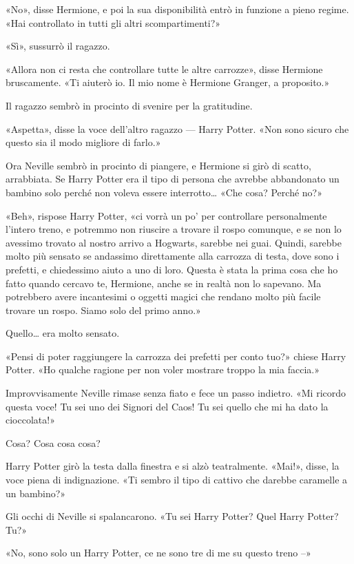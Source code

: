 «No», disse Hermione, e poi la sua disponibilità entrò in funzione a pieno regime. «Hai controllato in tutti gli altri scompartimenti?»

«Sì», sussurrò il ragazzo.

«Allora non ci resta che controllare tutte le altre carrozze», disse Hermione bruscamente. «Ti aiuterò io. Il mio nome è Hermione Granger, a proposito.»

Il ragazzo sembrò in procinto di svenire per la gratitudine.

«Aspetta», disse la voce dell’altro ragazzo — Harry Potter. «Non sono sicuro che questo sia il modo migliore di farlo.»

Ora Neville sembrò in procinto di piangere, e Hermione si girò di scatto, arrabbiata. Se Harry Potter era il tipo di persona che avrebbe abbandonato un bambino solo perché non voleva essere interrotto… «Che cosa? Perché no?»

«Beh», rispose Harry Potter, «ci vorrà un po’ per controllare personalmente l’intero treno, e potremmo non riuscire a trovare il rospo comunque, e se non lo avessimo trovato al nostro arrivo a Hogwarts, sarebbe nei guai. Quindi, sarebbe molto più sensato se andassimo direttamente alla carrozza di testa, dove sono i prefetti, e chiedessimo aiuto a uno di loro. Questa è stata la prima cosa che ho fatto quando cercavo te, Hermione, anche se in realtà non lo sapevano. Ma potrebbero avere incantesimi o oggetti magici che rendano molto più facile trovare un rospo. Siamo solo del primo anno.»

Quello… era molto sensato.

«Pensi di poter raggiungere la carrozza dei prefetti per conto tuo?» chiese Harry Potter. «Ho qualche ragione per non voler mostrare troppo la mia faccia.»

Improvvisamente Neville rimase senza fiato e fece un passo indietro. «Mi ricordo questa voce! Tu sei uno dei Signori del Caos! Tu sei quello che mi ha dato la cioccolata!»

Cosa? Cosa cosa cosa?

Harry Potter girò la testa dalla finestra e si alzò teatralmente. «Mai!», disse, la voce piena di indignazione. «Ti sembro il tipo di cattivo che darebbe caramelle a un bambino?»

Gli occhi di Neville si spalancarono. «Tu sei Harry Potter? Quel Harry Potter? Tu?»

«No, sono solo un Harry Potter, ce ne sono tre di me su questo treno –»

